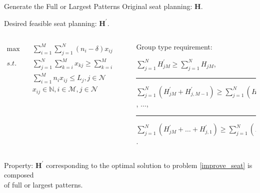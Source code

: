   \begin{frame}{Generate the Full or Largest Patterns}
    \small
    Original seat planning: $\bm{H}$.
    
    Desired feasible seat planning: $\bm{H}^{\prime}$.
    
    \begin{columns}
      \begin{column}{0.59\textwidth}
    \begin{equation}\label{improve_seat}
      \begin{aligned}
      \max \quad & \sum_{i=1}^{M} \sum_{j=1}^{N} (n_i-\delta)  x_{ij} \\
      s.t. \quad & \sum_{j=1}^{N} \sum_{k=i}^{M} x_{kj} \geq  \sum_{k=i}^{M} \sum_{j=1}^{N} H_{ji}, i \in \mathcal{M} \\
      & \sum_{i=1}^{M} n_{i} x_{ij} \leq L_{j}, j \in \mathcal{N} \\
      & x_{ij} \in \mathbb{N}, i \in \mathcal{M}, j \in \mathcal{N}
      \end{aligned}
    \end{equation}
  \end{column}
  \begin{column}{.02\textwidth}
    \rule{.1mm}{0.4\textheight}
\end{column}
  \begin{column}{0.39\textwidth}
    \scriptsize
    Group type requirement: \\ 
    \vspace{0.15cm}

    $\sum_{j=1}^{N} H^{'}_{jM} \geq \sum_{j=1}^{N} H_{jM}$,\\
    \rule[-1pt]{4cm}{0.03em}
    \vspace{0.1cm}

    $\sum_{j=1}^{N} (H^{'}_{jM}+H^{'}_{j,M-1}) \geq \sum_{j=1}^{N} (H_{jM}+H^{'}_{j,M-1})$, $\ldots$, \\ 
    \rule[-1pt]{4cm}{0.03em}
    \vspace{0.1cm}

    $\sum_{j=1}^{N} (H^{'}_{jM}+\ldots + H^{'}_{j,1}) \geq \sum_{j=1}^{N} (H_{jM}+\ldots+ H^{'}_{j,1})$.
  \end{column}
  \end{columns}

  \small
  \vspace{0.2cm}
    Property: {\color{red}$\bm{H}^{\prime}$} corresponding to the optimal solution to problem \eqref{improve_seat}  is composed \\ \hspace{1.5cm} of {\color{red}full or largest patterns}.
  \end{frame}

  